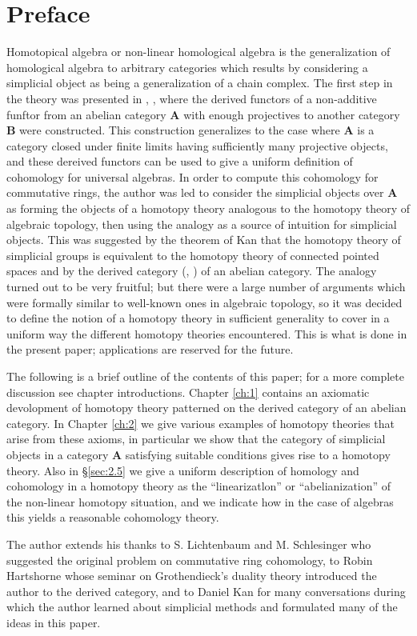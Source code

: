 \documentclass[../main]{subfiles}
\begin{document}
\chapter*{Preface}

Homotopical algebra or non-linear homological algebra is the
generalization of homological algebra to arbitrary categories
which results by considering a simplicial object as being a generalization of a chain complex. The first step in the theory was presented in \cite{dold_homology_1958}, \cite{dold_homologie_1961}, where the derived functors of a non-additive funftor from an abelian category $\mathbf{A}$ with enough projectives to another category $\mathbf{B}$ were constructed. This construction generalizes to the case where $\mathbf{A}$ is a category closed under finite limits having sufficiently many projective objects, and these dereived functors can be used to give a uniform definition of cohomology for universal algebras. In order to compute this cohomology for commutative rings, the author was led to consider the
simplicial objects over $\mathbf{A}$ as forming the objects of a homotopy
theory analogous to the homotopy theory of algebraic topology,
then using the analogy as a source of intuition for simplicial
objects. This was suggested by the theorem of Kan \cite{kan_homotopy_1958} that the
homotopy theory of simplicial groups is equivalent to the homotopy theory of connected pointed spaces and by the derived category (\cite{hartshorne_residues_1966}, \cite{verdier_categories_nodate}) of an abelian category. The analogy turned out
to be very fruitful; but there were a large number of arguments which were formally similar to well-known ones in algebraic topology, so it was decided to define the notion of a homotopy theory
in sufficient generality to cover in a uniform way the different
homotopy theories encountered. This is what is done in the present paper; applications are reserved for the future. 

The following is a brief outline of the contents of this paper; for a more complete discussion see chapter introductions. Chapter \ref{ch:1} contains an axiomatic devolopment of homotopy theory patterned on the derived category of an abelian category. In Chapter \ref{ch:2} we
give various examples of homotopy theories that arise from these
axioms, in particular we show that the category of simplicial objects in a category $\mathbf{A}$ satisfying suitable conditions gives rise
to a homotopy theory. Also in \S\ref{sec:2.5} we give a uniform description
of homology and cohomology in a homotopy theory as the ``linearizatlon'' or ``abelianization'' of the non-linear homotopy situation,
and we indicate how in the case of algebras this yields a reasonable cohomology theory.

The author extends his thanks to S. Lichtenbaum and
M. Schlesinger who suggested the original problem on commutative
ring cohomology, to Robin Hartshorne whose seminar \cite{hartshorne_residues_1966} on
Grothendieck's duality theory introduced the author to the derived
category, and to Daniel Kan for many conversations during which
the author learned about simplicial methods and formulated many
of the ideas in this paper.
\end{document}
